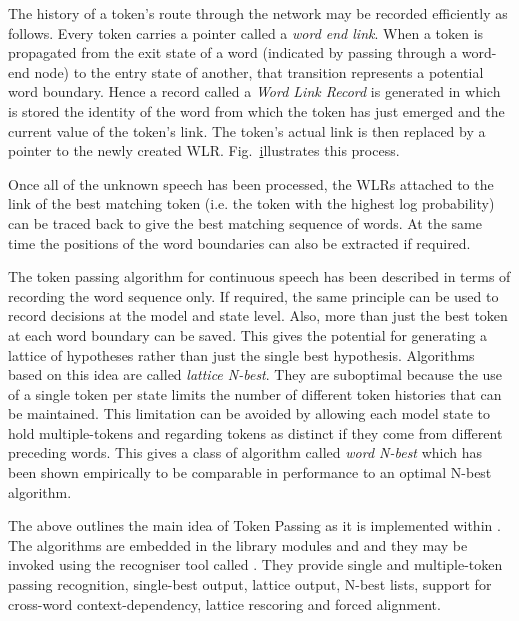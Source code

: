 
The history of a token's route through the network may be 
recorded efficiently as follows.  Every token carries a pointer
called a {\it word end link}.  When a token is propagated from the 
exit state of a word (indicated by passing through a 
word-end node)
to the entry state of another, that transition
represents a potential word boundary.  Hence a record called 
a {\it Word Link Record} is generated
in which is stored the identity of the word from which the token
has just emerged and the current value of the token's link.  The
token's actual link is then replaced by a pointer to the newly
created WLR.  Fig.~\href{f:wlroper} illustrates this process.

Once all of the unknown speech has been processed, the WLRs
attached to the link of the best matching token
(i.e. the token with the highest log probability)
can be traced back to give the best matching sequence of words.
At the same time the positions of the word boundaries can also
be extracted if required.  


The token passing algorithm for continuous speech has been described
in terms of recording the word sequence only.  If required, the same
principle can be used to record decisions at the model and state level.
Also, more than just the best token at each word boundary can be saved.
This gives the potential for generating a lattice of hypotheses rather
than just the single best hypothesis.  Algorithms based on this idea
are called \textit{lattice N-best}.   
They are suboptimal because the
use of a single token per state limits the number of different token
histories that can be maintained.  This limitation can be avoided by
allowing each model state to hold multiple-tokens and regarding
tokens as distinct if they come from different preceding words.  This
gives a class of algorithm called  \textit{word N-best} which has been
shown empirically to be comparable in performance to an optimal N-best
algorithm. 

The above outlines the main idea of Token Passing as it is
implemented within \HTK. The algorithms are embedded in the
library modules  and 
 and they may be
invoked using the recogniser tool called .
They provide single and multiple-token 
passing recognition, single-best
output, lattice output, N-best lists, support for cross-word context-dependency,
lattice rescoring and forced alignment.

